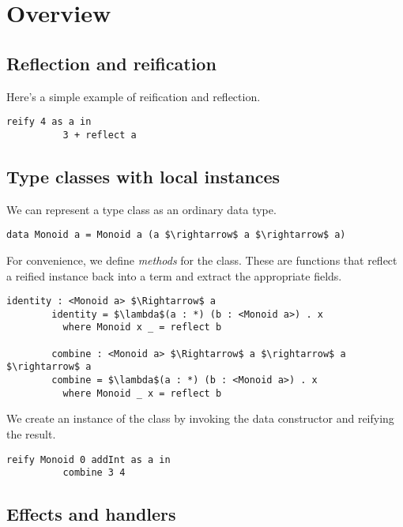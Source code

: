 \section{Overview}

  \subsection{Reflection and reification}

    Here's a simple example of reification and reflection.

    \noindent
    \begin{minipage}{\linewidth}
      \begin{lstlisting}[gobble=8, mathescape=true]
        reify 4 as a in
          3 + reflect a
      \end{lstlisting}
    \end{minipage}

  \subsection{Type classes with local instances}

    We can represent a type class as an ordinary data type.

    \noindent
    \begin{minipage}{\linewidth}
      \begin{lstlisting}[gobble=8, mathescape=true]
        data Monoid a = Monoid a (a $\rightarrow$ a $\rightarrow$ a)
      \end{lstlisting}
    \end{minipage}

    \noindent For convenience, we define \emph{methods} for the class. These are functions that reflect a reified instance back into a term and extract the appropriate fields.

    \noindent
    \begin{minipage}{\linewidth}
      \begin{lstlisting}[gobble=8, mathescape=true]
        identity : <Monoid a> $\Rightarrow$ a
        identity = $\lambda$(a : *) (b : <Monoid a>) . x
          where Monoid x _ = reflect b

        combine : <Monoid a> $\Rightarrow$ a $\rightarrow$ a $\rightarrow$ a
        combine = $\lambda$(a : *) (b : <Monoid a>) . x
          where Monoid _ x = reflect b
      \end{lstlisting}
    \end{minipage}

    \noindent We create an instance of the class by invoking the data constructor and reifying the result.

    \noindent
    \begin{minipage}{\linewidth}
      \begin{lstlisting}[gobble=8, mathescape=true]
        reify Monoid 0 addInt as a in
          combine 3 4
      \end{lstlisting}
    \end{minipage}

  \subsection{Effects and handlers}

